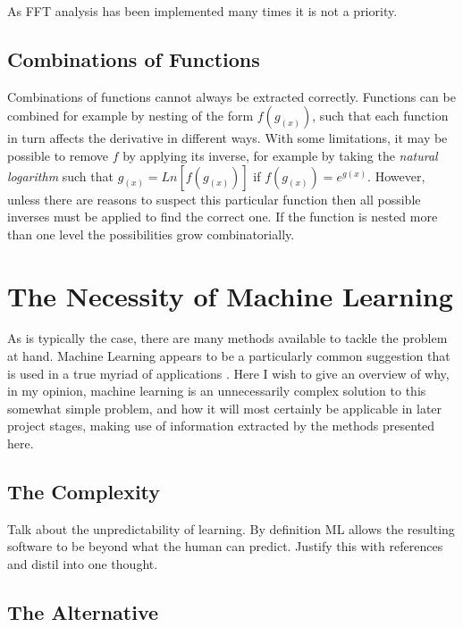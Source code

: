 \documentclass[main.tex]{subfiles}
\begin{document}
      As FFT analysis has been implemented many times it is not a priority.
    
    \subsection{Combinations of Functions}
    \label{sec:back:combFunc}
      Combinations of functions cannot always be extracted correctly. Functions can be combined for example by nesting of the form $f(g_{(x)})$, such that each function in turn affects the derivative in different ways. With some limitations, it may be possible to remove $f$ by applying its inverse, for example by taking the \textit{natural logarithm} such that $g_{(x)}=Ln\left [ f(g_{(x)})\right ]$ if $f(g_{(x)}) = e^{g(x)}$. However, unless there are reasons to suspect this particular function then all possible inverses must be applied to find the correct one. If the function is nested more than one level the possibilities grow combinatorially. 
      
      
  \section{The Necessity of Machine Learning}
  
    As is typically the case, there are many methods available to tackle the problem at hand. Machine Learning appears to be a particularly common suggestion that is used in a true myriad of applications \cite{}. Here I wish to give an overview of why, in my opinion, machine learning is an unnecessarily complex solution to this somewhat simple problem, and how it will most certainly be applicable in later project stages, making use of information extracted by the methods presented here.
    
    \subsection{The Complexity}
    
      Talk about the unpredictability of learning. By definition ML allows the resulting software to be beyond what the human can predict. Justify this with references and distil into one thought.
    
    \subsection{The Alternative}
    
\end{document}
